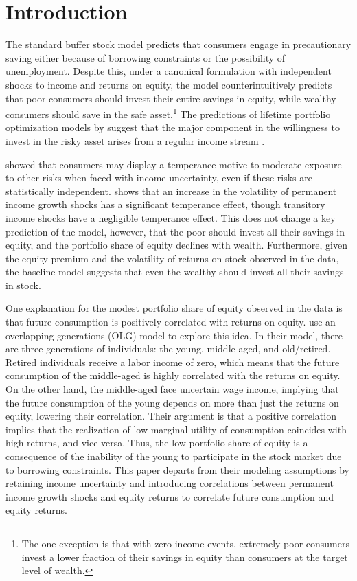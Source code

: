 \section{Introduction}

The standard buffer stock model \citep{Deaton1991, Carroll1992} predicts that consumers engage in precautionary saving either because of borrowing constraints or the possibility of unemployment. Despite this, under a canonical formulation with independent shocks to income and returns on equity, the model counterintuitively predicts that poor consumers should invest their entire savings in equity, while wealthy consumers should save in the safe asset.\footnote{The one exception is that with zero income events, extremely poor consumers invest a lower fraction of their savings in equity than consumers at the target level of wealth.} The predictions of lifetime portfolio optimization models by \citet{Merton1969, Samuelson1969} suggest that the major component in the willingness to invest in the risky asset arises from a regular income stream \citep{Heaton1997}. 

\citet{Kimball1991} showed that consumers may display a temperance motive to moderate exposure to other risks when faced with income uncertainty, even if these risks are statistically independent. \citet{Koo1999} shows that an increase in the volatility of permanent income growth shocks has a significant temperance effect, though transitory income shocks have a negligible temperance effect. This does not change a key prediction of the model, however, that the poor should invest all their savings in equity, and the portfolio share of equity declines with wealth. Furthermore, given the equity premium and the volatility of returns on stock observed in the data, the baseline model suggests that even the wealthy should invest all their savings in stock.

One explanation for the modest portfolio share of equity observed in the data is that future consumption is positively correlated with returns on equity. \citet{Constantinides2002} use an overlapping generations (OLG) model to explore this idea. In their model, there are three generations of individuals: the young, middle-aged, and old/retired. Retired individuals receive a labor income of zero, which means that the future consumption of the middle-aged is highly correlated with the returns on equity. On the other hand, the middle-aged face uncertain wage income, implying that the future consumption of the young depends on more than just the returns on equity, lowering their correlation. Their argument is that a positive correlation implies that the realization of low marginal utility of consumption coincides with high returns, and vice versa. Thus, the low portfolio share of equity is a consequence of the inability of the young to participate in the stock market due to borrowing constraints. This paper departs from their modeling assumptions by retaining income uncertainty and introducing correlations between permanent income growth shocks and equity returns to correlate future consumption and equity returns.

